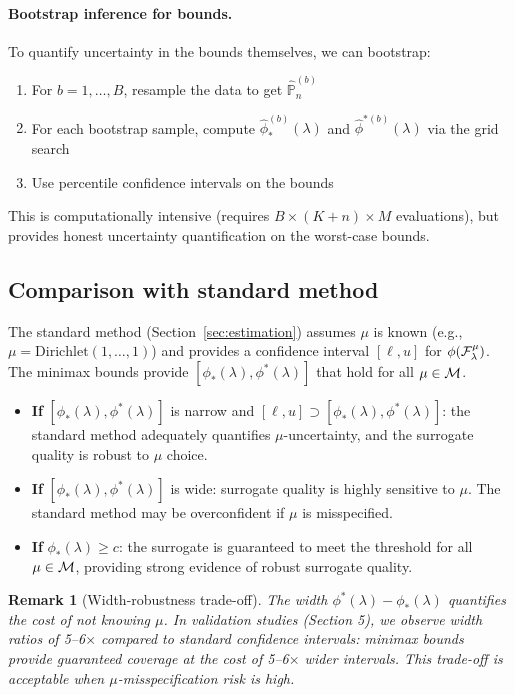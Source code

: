 \documentclass{article}
\newtheorem{remark}{Remark}
\newcommand{\PP}{\mathbb{P}}
\begin{document}
\paragraph{Bootstrap inference for bounds.}
To quantify uncertainty in the bounds themselves, we can bootstrap:
\begin{enumerate}
    \item For $b = 1, \ldots, B$, resample the data to get $\hat{\PP}_n^{(b)}$
    \item For each bootstrap sample, compute $\hat{\phi}_*^{(b)}(\lambda)$ and $\hat{\phi}^{*(b)}(\lambda)$ via the grid search
    \item Use percentile confidence intervals on the bounds
\end{enumerate}

This is computationally intensive (requires $B \times (K + n) \times M$ evaluations), but provides honest uncertainty quantification on the worst-case bounds.

\subsection{Comparison with standard method}

The standard method (Section~\ref{sec:estimation}) assumes $\mu$ is known (e.g., $\mu = \text{Dirichlet}(1, \ldots, 1)$) and provides a confidence interval $[\ell, u]$ for $\phi(\mathcal{F}_\lambda^\mu)$. The minimax bounds provide $[\phi_*(\lambda), \phi^*(\lambda)]$ that hold for all $\mu \in \mathcal{M}$.

\begin{itemize}
    \item \textbf{If} $[\phi_*(\lambda), \phi^*(\lambda)]$ is narrow and $[\ell, u] \supset [\phi_*(\lambda), \phi^*(\lambda)]$: the standard method adequately quantifies $\mu$-uncertainty, and the surrogate quality is robust to $\mu$ choice.

    \item \textbf{If} $[\phi_*(\lambda), \phi^*(\lambda)]$ is wide: surrogate quality is highly sensitive to $\mu$. The standard method may be overconfident if $\mu$ is misspecified.

    \item \textbf{If} $\phi_*(\lambda) \geq c$: the surrogate is guaranteed to meet the threshold for all $\mu \in \mathcal{M}$, providing strong evidence of robust surrogate quality.
\end{itemize}

\begin{remark}[Width-robustness trade-off]
The width $\phi^*(\lambda) - \phi_*(\lambda)$ quantifies the cost of not knowing $\mu$. In validation studies (Section 5), we observe width ratios of 5--6$\times$ compared to standard confidence intervals: minimax bounds provide guaranteed coverage at the cost of 5--6$\times$ wider intervals. This trade-off is acceptable when $\mu$-misspecification risk is high.
\end{remark}
\end{document}
